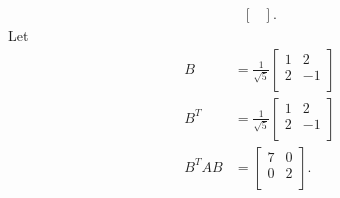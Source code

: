 \documentclass{report}
\begin{document}
{\begin{align*}
\begin{bmatrix}
   \end{bmatrix}
   .\end{align*}
   Let 
   \begin{align*}
    B &= \frac{1}{ \sqrt{5} } \begin{bmatrix}
    1 & 2\\
    2 & -1\\
    \end{bmatrix}\\
    B ^{T} &= \frac{1}{ \sqrt{5} } \begin{bmatrix}
    1 & 2\\
    2 & -1\\
    \end{bmatrix}\\
    B ^{T}A B &= \begin{bmatrix}
    7 & 0\\
    0 & 2\\
    \end{bmatrix}
   .\end{align*}
   }
\end{document}
